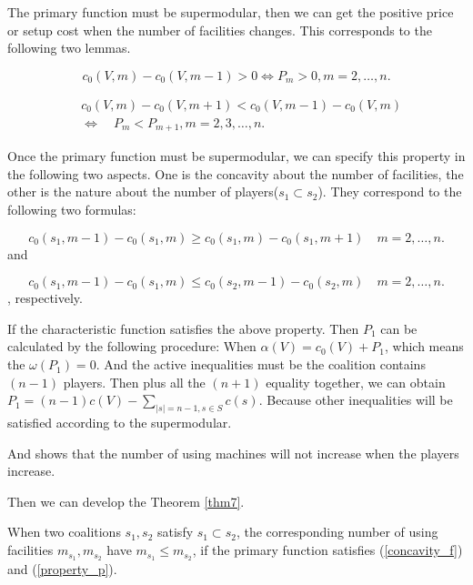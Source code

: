 The primary function must be supermodular, then we can get the positive price or setup cost when the number of facilities changes. This corresponds to the following two lemmas.


\begin{lem}\label{lem2}
\[c_0(V,m)- c_0(V,m-1) > 0 \Leftrightarrow P_m > 0, m=2,\ldots,n.\]
\end{lem}

\begin{lem}\label{lem3}
\[
\begin{aligned}
&c_0 (V,m) - c_0 (V,m+1) < c_0 (V,m-1) - c_0 (V,m) \\
&\Leftrightarrow \quad P_m < P_{m+1} , m=2,3,\ldots,n.
\end{aligned}
\]
\end{lem}

Once the primary function must be supermodular, we can specify this property in the following two aspects.
One is the concavity about the number of facilities,
the other is the nature about the number of players($s_1 \subset s_2$).
They correspond to the following two formulas:

\begin{equation}\label{concavity_f}
c_0(s_1,m-1)-c_0(s_1,m) \geq
  c_0(s_1,m)-c_0(s_1,m+1) \quad m=2,\ldots,n.
\end{equation}
and

\begin{equation}\label{property_p}
	c_0(s_1,m-1)-c_0(s_1,m) \leq
	  c_0(s_2,m-1)-c_0(s_2,m) \quad m=2,\ldots,n.
\end{equation}
, respectively.

If the characteristic function satisfies the above property. Then $ P_1$ can be calculated by the following procedure:
When $\alpha(V) = c_0(V) + P_1$, which means the $\omega(P_1) = 0$. And the active inequalities must be the coalition contains $(n-1)$ players.
Then plus all the $(n+1)$ equality together, we can obtain $P_1 = (n-1)c(V)- \sum_{|s|=n-1,s\in S}c(s)$.
Because other inequalities will be satisfied according to the supermodular.

And shows that the number of using machines will not increase when the players increase.

Then we can develop the Theorem \ref{thm7}.
\begin{thm}\label{thm7}
When two coalitions $s_1,s_2$ satisfy $s_1 \subset s_2$, the corresponding number of using facilities $ m_{s_1}, m_{s_2}$ have $m_{s_1} \leq m_{s_2}$, if the primary function satisfies  (\ref{concavity_f}) and (\ref{property_p}).
\end{thm}
